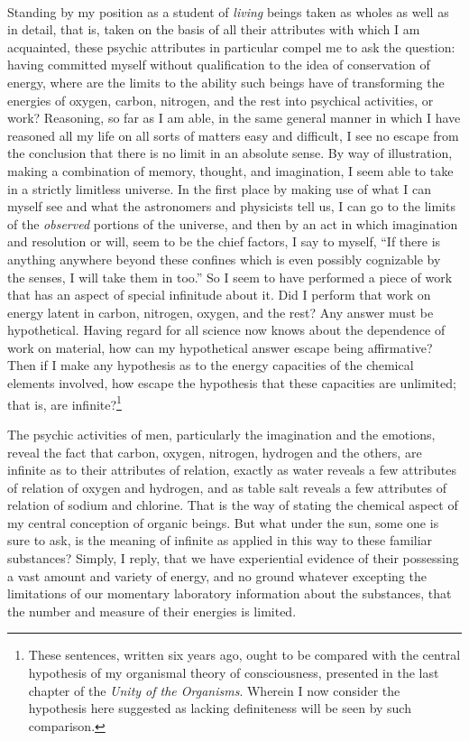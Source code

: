 \documentclass[a4paper, 11pt, oneside, polutonikogreek, english]{article}
\begin{document}
\paragraph{}
Standing by my position as a student of \emph{living} beings taken as wholes as well as in detail, that is, taken on the basis of all their attributes with which I am acquainted, these psychic attributes in particular compel me to ask the question: having committed myself without qualification to the idea of conservation of energy, where are the limits to the ability such beings have of transforming the energies of oxygen, carbon, nitrogen, and the rest into psychical activities, or work? Reasoning, so far as I am able, in the same general manner in which I have reasoned all my life on all sorts of matters easy and difficult, I see no escape from the conclusion that there is no limit in an absolute sense. By way of illustration, making a combination of memory, thought, and imagination, I seem able to take in a strictly limitless universe. In the first place by making use of what I can myself see and what the astronomers and physicists tell us, I can go to the limits of the \emph{observed} portions of the universe, and then by an act in which imagination and resolution or will, seem to be the chief factors, I say to myself, ``If there is anything anywhere beyond these confines which is even possibly cognizable by the senses, I will take them in too.'' So I seem to have performed a piece of work that has an aspect of special infinitude about it. Did I perform that work on energy latent in carbon, nitrogen, oxygen, and the rest? Any answer must be hypothetical. Having regard for all science now knows about the dependence of work on material, how can my hypothetical answer escape being affirmative? Then if I make any hypothesis as to the energy capacities of the chemical elements involved, how escape the hypothesis that these capacities are unlimited; that is, are infinite?\footnote{These sentences, written six years ago, ought to be compared with the central hypothesis of my organismal theory of consciousness, presented in the last chapter of the \emph{Unity of the Organisms}. Wherein I now consider the hypothesis here suggested as lacking definiteness will be seen by such comparison.}

The psychic activities of men, particularly the imagination and the emotions, reveal the fact that carbon, oxygen, nitrogen, hydrogen and the others, are infinite as to their attributes of relation, exactly as water reveals a few attributes of relation of oxygen and hydrogen, and as table salt reveals a few attributes of relation of sodium and chlorine. That is the way of stating the chemical aspect of my central conception of organic beings. But what under the sun, some one is sure to ask, is the meaning of infinite as applied in this way to these familiar substances? Simply, I reply, that we have experiential evidence of their possessing a vast amount and variety of energy, and no ground whatever excepting the limitations of our momentary laboratory information about the substances, that the number and measure of their energies is limited.
\end{document}
